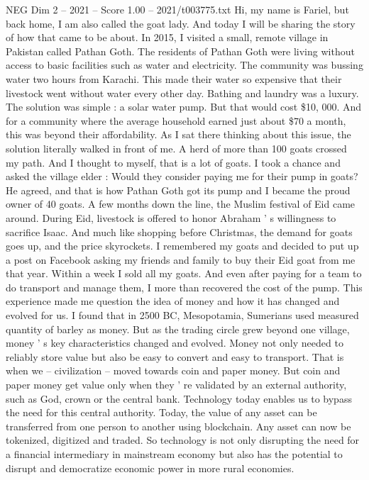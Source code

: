 \begin{textsample}{NEG Dim 2 – 2021 – Score 1.00 – 2021/t003775.txt}  \label{ex:f2_neg_070}
Hi, my name is Fariel, but back home, I am also called the goat lady.
And today I will be sharing the story of how that came to be about.
In 2015, I visited a small, remote village in Pakistan called Pathan Goth.
The residents of Pathan Goth were living without access to basic facilities such as water and electricity.
The community was bussing water two hours from Karachi.
This made their water so expensive that their livestock went without water every other day.
Bathing and laundry was a luxury.
The solution was simple : a solar water pump.
But that would cost \$10, 000.
And for a community where the average household earned just about \$70 a month, this was beyond their affordability.
As I sat there thinking about this issue, the solution literally walked in front of me.
A herd of more than 100 goats crossed my path.
And I thought to myself, that is a lot of goats.
I took a chance and asked the village elder : Would they consider paying me for their pump in goats?
He agreed, and that is how Pathan Goth got its pump and I became the proud owner of 40 goats.
A few months down the line, the Muslim festival of Eid came around.
During Eid, livestock is offered to honor Abraham ' s willingness to sacrifice Isaac.
And much like shopping before Christmas, the demand for goats goes up, and the price skyrockets.
I remembered my goats and decided to put up a post on Facebook asking my friends and family to buy their Eid goat from me that year.
Within a week I sold all my goats.
And even after paying for a team to do transport and manage them, I more than recovered the cost of the pump.
This experience made me question the idea of money and how it has changed and evolved for us.
I found that in 2500 BC, Mesopotamia, Sumerians used measured quantity of barley as money.
But as the trading circle grew beyond one village, money ' s key characteristics changed and evolved.
Money not only needed to reliably store value but also be easy to convert and easy to transport.
That is when we -- civilization -- moved towards coin and paper money.
But coin and paper money get value only when they ' re validated by an external authority, such as God, crown or the central bank.
Technology today enables us to bypass the need for this central authority.
Today, the value of any asset can be transferred from one person to another using blockchain.
Any asset can now be tokenized, digitized and traded.
So technology is not only disrupting the need for a financial intermediary in mainstream economy but also has the potential to disrupt and democratize economic power in more rural economies.

\end{textsample}
